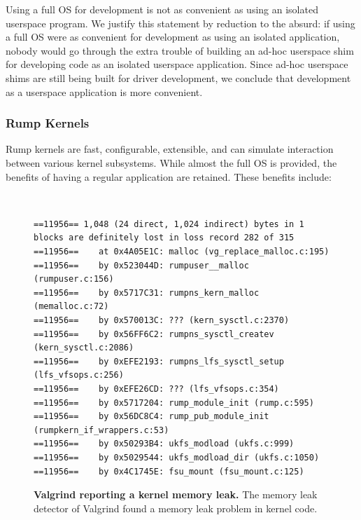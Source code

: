 Using a full OS for development is not as convenient as using an
isolated userspace program.  We justify this statement by reduction
to the absurd: if using a full OS were as convenient for development
as using an isolated application, nobody would go through the extra
trouble of building an ad-hoc userspace shim for developing code
as an isolated userspace application.  Since ad-hoc userspace shims
are still being built for driver development, we conclude that
development as a userspace application is more convenient.

\subsubsection*{Rump Kernels}

Rump kernels are fast, configurable, extensible, and can simulate
interaction between various kernel subsystems.  While almost the
full OS is provided, the benefits of having a regular application
are retained.  These benefits include:

\begin{figure}[t]
{\tt \scriptsize
\begin{verbatim}
==11956== 1,048 (24 direct, 1,024 indirect) bytes in 1 blocks are definitely lost in loss record 282 of 315
==11956==    at 0x4A05E1C: malloc (vg_replace_malloc.c:195)
==11956==    by 0x523044D: rumpuser__malloc (rumpuser.c:156)
==11956==    by 0x5717C31: rumpns_kern_malloc (memalloc.c:72)
==11956==    by 0x570013C: ??? (kern_sysctl.c:2370)
==11956==    by 0x56FF6C2: rumpns_sysctl_createv (kern_sysctl.c:2086)
==11956==    by 0xEFE2193: rumpns_lfs_sysctl_setup (lfs_vfsops.c:256)
==11956==    by 0xEFE26CD: ??? (lfs_vfsops.c:354)
==11956==    by 0x5717204: rump_module_init (rump.c:595)
==11956==    by 0x56DC8C4: rump_pub_module_init (rumpkern_if_wrappers.c:53)
==11956==    by 0x50293B4: ukfs_modload (ukfs.c:999)
==11956==    by 0x5029544: ukfs_modload_dir (ukfs.c:1050)
==11956==    by 0x4C1745E: fsu_mount (fsu_mount.c:125)
\end{verbatim}}
\caption[Valgrind reporting a kernel memory leak]{
\textbf{Valgrind reporting a kernel memory leak.}
The memory leak detector of Valgrind found a memory leak problem
in kernel code.
}
\label{fig:valgrind}
\end{figure}


